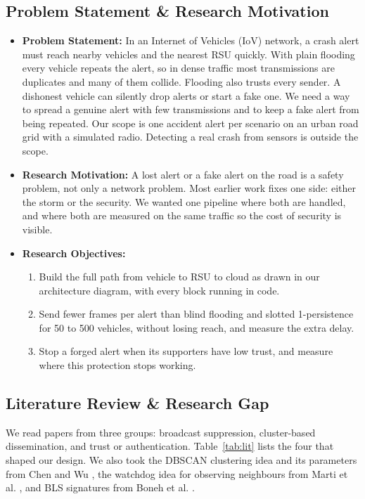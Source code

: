 \documentclass[11pt, a4paper]{article}
\begin{document}
\subsection{Problem Statement \& Research Motivation}
\begin{itemize}[noitemsep, topsep=2pt]
    \item \textbf{Problem Statement:} In an Internet of Vehicles (IoV) network, a crash alert must reach nearby vehicles and the nearest RSU quickly. With plain flooding every vehicle repeats the alert, so in dense traffic most transmissions are duplicates and many of them collide. Flooding also trusts every sender. A dishonest vehicle can silently drop alerts or start a fake one. We need a way to spread a genuine alert with few transmissions and to keep a fake alert from being repeated. Our scope is one accident alert per scenario on an urban road grid with a simulated radio. Detecting a real crash from sensors is outside the scope.
    \item \textbf{Research Motivation:} A lost alert or a fake alert on the road is a safety problem, not only a network problem. Most earlier work fixes one side: either the storm or the security. We wanted one pipeline where both are handled, and where both are measured on the same traffic so the cost of security is visible.
    \item \textbf{Research Objectives:}
    \begin{enumerate}[noitemsep, topsep=2pt]
        \item Build the full path from vehicle to RSU to cloud as drawn in our architecture diagram, with every block running in code.
        \item Send fewer frames per alert than blind flooding and slotted 1-persistence for 50 to 500 vehicles, without losing reach, and measure the extra delay.
        \item Stop a forged alert when its supporters have low trust, and measure where this protection stops working.
    \end{enumerate}
\end{itemize}

\subsection{Literature Review \& Research Gap}
\noindent
We read papers from three groups: broadcast suppression, cluster-based dissemination, and trust or authentication. Table~\ref{tab:lit} lists the four that shaped our design. We also took the DBSCAN clustering idea and its parameters from Chen and Wu \cite{chen2024}, the watchdog idea for observing neighbours from Marti et al. \cite{marti2000}, and BLS signatures from Boneh et al. \cite{boneh2004}.
\end{document}
